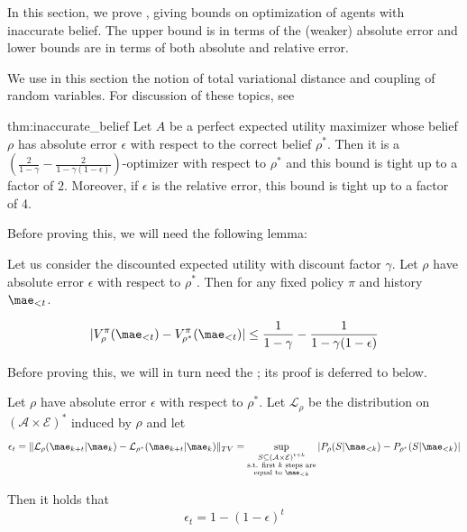In this section, we prove , giving bounds on optimization of agents with inaccurate belief. The upper bound is in terms of the (weaker) absolute error and lower bounds are in terms of both absolute and relative error.

We use in this section the notion of total variational distance and coupling of random variables. For discussion of these topics, see \cite[Chapter 4.2]{levinmarkov}

\begin{repeatthm}{thm:inaccurate_belief}
Let $A$ be a perfect expected utility maximizer whose belief $\rho$ has absolute error $\epsilon$ with respect to the correct belief $\rho^*$. Then it is a $(\frac{2}{1-\gamma} - \frac{2}{1- \gamma(1-\epsilon)})$-optimizer with respect to $\rho^*$ and this bound is tight up to a factor of $2$. Moreover, if $\epsilon$ is the relative error, this bound is tight up to a factor of 4.
\end{repeatthm}

Before proving this, we will need the following lemma:
\begin{lemma} \label{lem:epsilon_bound_belief}
Let us consider the discounted expected utility with discount factor $\gamma$. Let $\rho$ have absolute error $\epsilon$ with respect to $\rho^*$. Then for any fixed policy $\pi$ and history $\mae_{<t}$.

\begin{gather}
|V_\rho^\pi(\mae_{<t}) - V_{\rho^*}^\pi(\mae_{<t})| \leq \frac{1}{1-\gamma} - \frac{1}{1- \gamma(1-\epsilon)}
\end{gather}

\end{lemma}
Before proving this, we will in turn need the ; its proof is deferred to below.
\begin{lemma} \label{lem:belief_v_bound}
Let $\rho$ have absolute error $\epsilon$ with respect to $\rho^*$. Let $\mathcal{L}_\rho$ be the distribution on $(\mathcal{A}\times \mathcal{E})^*$ induced by $\rho$ and let
\[
\epsilon_{t} = \|\mathcal{L}_\rho (\mae_{k+t} | \mae_k) - \mathcal{L}_{\rho^*} (\mae_{k+t} | \mae_k) \|_{TV} = \sup_{\substack{S \subseteq (\mathcal{A \times E})^{t+k} \\ \text{s.t. first $k$ steps are}\\\text{equal to $\mae_{<k}$}}} |P_\rho(S | \mae_{<k}) - P_{\rho^*}(S | \mae_{<k})|
\]

Then it holds that
\[
\epsilon_{t} = 1-(1-\epsilon)^t
\]
\end{lemma}

